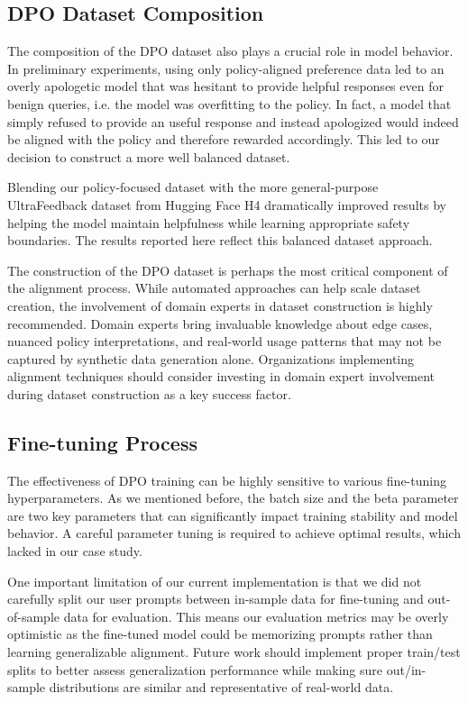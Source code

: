 \subsection{DPO Dataset Composition}

The composition of the DPO dataset also plays a crucial role in model behavior. In preliminary experiments, using only policy-aligned preference data led to an overly apologetic model that was hesitant to provide helpful responses even for benign queries, i.e. the model was overfitting to the policy. In fact, a model that simply refused to provide an useful response and instead apologized would indeed be aligned with the policy and therefore rewarded accordingly. This led to our decision to construct a more well balanced dataset.

Blending our policy-focused dataset with the more general-purpose UltraFeedback dataset from Hugging Face H4  dramatically improved results by helping the model maintain helpfulness while learning appropriate safety boundaries. The results reported here reflect this balanced dataset approach. 

The construction of the DPO dataset is perhaps the most critical component of the alignment process. While automated approaches can help scale dataset creation, the involvement of domain experts in dataset construction is highly recommended. Domain experts bring invaluable knowledge about edge cases, nuanced policy interpretations, and real-world usage patterns that may not be captured by synthetic data generation alone. Organizations implementing alignment techniques should consider investing in domain expert involvement during dataset construction as a key success factor.

\subsection{Fine-tuning Process}
 
The effectiveness of DPO training can be highly sensitive to various fine-tuning hyperparameters. As we mentioned before, the batch size and the beta parameter are two key parameters that can significantly impact training stability and model behavior. A careful parameter tuning is required to achieve optimal results, which lacked in our case study.

One important limitation of our current implementation is that we did not carefully split our user prompts between in-sample data for fine-tuning and out-of-sample data for evaluation. This means our evaluation metrics may be overly optimistic as the fine-tuned model could be memorizing prompts rather than learning generalizable alignment. Future work should implement proper train/test splits to better assess generalization performance while making sure out/in-sample distributions are similar and representative of real-world data.


